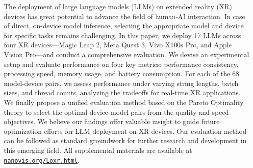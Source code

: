 The deployment of large language models (LLMs) on extended reality (XR) devices has great potential to advance the field of human-AI interaction. In case of direct, on-device model inference, selecting the appropriate model and device for specific tasks remains challenging. In this paper, we deploy 17 LLMs across four XR devices—Magic Leap 2, Meta Quest 3, Vivo X100s Pro, and Apple Vision Pro—and conduct a comprehensive evaluation. We devise an experimental setup and evaluate performance on four key metrics: performance consistency, processing speed, memory usage, and battery consumption. 
For each of the 68 model-device pairs, we assess performance under varying string lengths, batch sizes, and thread counts, analyzing the tradeoffs for real-time XR applications. We finally propose a unified evaluation method based on the Pareto Optimality theory to select the optimal device-model pairs from the quality and speed objectives.  
We believe our findings offer valuable insight to guide future optimization efforts for LLM deployment on XR devices. Our evaluation method can be followed as standard groundwork for further research and development in this emerging field.  All supplemental materials are available at \href{www.nanovis.org/Loxr.html}{\texttt{nanovis.org/Loxr.html}}.